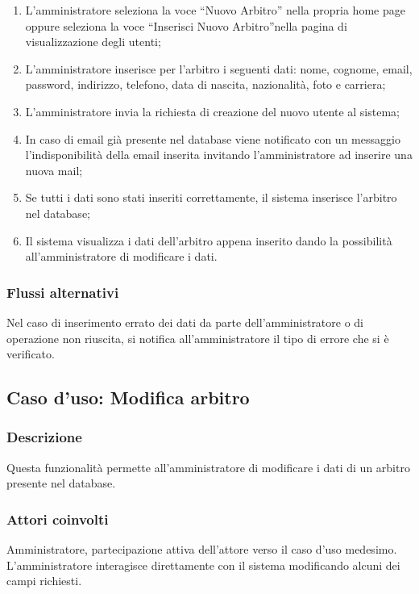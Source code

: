 \begin{enumerate}
	
	\item
	L'amministratore seleziona la voce ``Nuovo Arbitro'' nella propria home page oppure seleziona la voce ``Inserisci Nuovo Arbitro''nella pagina di visualizzazione degli utenti;
	
	\item
	L'amministratore inserisce per l'arbitro i seguenti dati: nome, cognome, email, password, indirizzo, telefono, data di nascita, nazionalità, foto e carriera;
	
	\item
	L'amministratore invia la richiesta di creazione del nuovo utente al sistema;
	
	\item
	In caso di email già presente nel database viene notificato con un messaggio l'indisponibilità della email inserita invitando l'amministratore ad inserire una nuova mail;
	
	\item
	Se tutti i dati sono stati inseriti correttamente, il sistema inserisce l'arbitro nel database;
	
	\item
	Il sistema visualizza i dati dell'arbitro appena inserito dando la possibilità all'amministratore di modificare i dati.
	
\end{enumerate}

\subsubsection*{Flussi alternativi}
Nel caso di inserimento errato dei dati da parte dell'amministratore o di operazione non riuscita, si notifica all'amministratore il tipo di errore che si è verificato.


%
%
\subsection{Caso d'uso: Modifica arbitro}

\subsubsection*{Descrizione}
Questa funzionalità permette all'amministratore di modificare i dati di un arbitro presente nel database.

\subsubsection*{Attori coinvolti}
Amministratore, partecipazione attiva dell'attore verso il caso d'uso medesimo.
L'amministratore interagisce direttamente con il sistema modificando alcuni dei campi richiesti.

